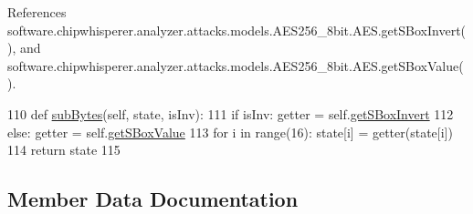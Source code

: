 References software.\+chipwhisperer.\+analyzer.\+attacks.\+models.\+A\+E\+S256\+\_\+8bit.\+A\+E\+S.\+get\+S\+Box\+Invert(), and software.\+chipwhisperer.\+analyzer.\+attacks.\+models.\+A\+E\+S256\+\_\+8bit.\+A\+E\+S.\+get\+S\+Box\+Value().


\begin{DoxyCode}
110     \textcolor{keyword}{def }\hyperlink{classsoftware_1_1chipwhisperer_1_1analyzer_1_1attacks_1_1models_1_1AES256__8bit_1_1AES_a1c5ee9303e72ff765a98827ba6d80259}{subBytes}(self, state, isInv):
111         \textcolor{keywordflow}{if} isInv: getter = self.\hyperlink{classsoftware_1_1chipwhisperer_1_1analyzer_1_1attacks_1_1models_1_1AES256__8bit_1_1AES_a693835484cef99fc3629f028cb243d10}{getSBoxInvert}
112         \textcolor{keywordflow}{else}: getter = self.\hyperlink{classsoftware_1_1chipwhisperer_1_1analyzer_1_1attacks_1_1models_1_1AES256__8bit_1_1AES_ab4ebe558a658ffc5280e8c35c774df96}{getSBoxValue}
113         \textcolor{keywordflow}{for} i \textcolor{keywordflow}{in} range(16): state[i] = getter(state[i])
114         \textcolor{keywordflow}{return} state
115 
\end{DoxyCode}


\subsection{Member Data Documentation}
\hypertarget{classsoftware_1_1chipwhisperer_1_1analyzer_1_1attacks_1_1models_1_1AES256__8bit_1_1AES_af10fdd6936815d7191116ed75863d52c}{}
